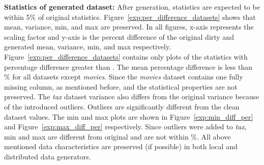 \textbf{Statistics of generated dataset:} 
After generation, statistics are expected to be within 5\% of original statistics.
Figure~\ref{exp:per_difference_datasets} shows that mean, variance, min, and max are preserved.
In all figures, x-axis represents the scaling factor and y-axis is the percent difference of the original dirty and generated mean, variance, min, and max respectively.
Figure~\ref{exp:per_difference_datasets} contains only plots of the statistics with percentage difference greater than .
The mean percentage difference is less than \% for all datasets except \textit{movies}.
Since the \textit{movies} dataset contains one fully missing column, as mentioned before, and the statistical properties are not preserved.
The \textit{tax} dataset variance also differs from the original variance because of the introduced outliers. 
Outliers are significantly different from the clean dataset values.
The min and max plots are shown in Figure~\ref{exp:min_diff_per} and Figure~\ref{exp:max_diff_per} respectively.
Since outliers were added to \textit{tax}, min and max are different from original and are not within \%.
All above mentioned data characteristics are preserved (if possible) in both local and distributed data generators.

